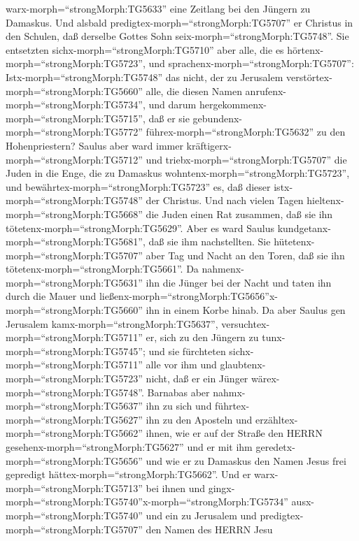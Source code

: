 warx-morph=``strongMorph:TG5633'' eine Zeitlang bei den Jüngern zu
Damaskus.  Und alsbald
predigtex-morph=``strongMorph:TG5707'' er Christus in den Schulen, daß
derselbe Gottes Sohn seix-morph=``strongMorph:TG5748''. 
Sie entsetzten sichx-morph=``strongMorph:TG5710'' aber alle, die es
hörtenx-morph=``strongMorph:TG5723'', und
sprachenx-morph=``strongMorph:TG5707'':
Istx-morph=``strongMorph:TG5748'' das nicht, der zu Jerusalem
verstörtex-morph=``strongMorph:TG5660'' alle, die diesen Namen
anrufenx-morph=``strongMorph:TG5734'', und darum
hergekommenx-morph=``strongMorph:TG5715'', daß er sie
gebundenx-morph=``strongMorph:TG5772''
führex-morph=``strongMorph:TG5632'' zu den Hohenpriestern? 
Saulus aber ward immer kräftigerx-morph=``strongMorph:TG5712'' und
triebx-morph=``strongMorph:TG5707'' die Juden in die Enge, die zu
Damaskus wohntenx-morph=``strongMorph:TG5723'', und
bewährtex-morph=``strongMorph:TG5723'' es, daß dieser
istx-morph=``strongMorph:TG5748'' der Christus.  Und nach
vielen Tagen hieltenx-morph=``strongMorph:TG5668'' die Juden einen Rat
zusammen, daß sie ihn tötetenx-morph=``strongMorph:TG5629''.
 Aber es ward Saulus
kundgetanx-morph=``strongMorph:TG5681'', daß sie ihm nachstellten. Sie
hütetenx-morph=``strongMorph:TG5707'' aber Tag und Nacht an den Toren,
daß sie ihn tötetenx-morph=``strongMorph:TG5661''.  Da
nahmenx-morph=``strongMorph:TG5631'' ihn die Jünger bei der Nacht und
taten ihn durch die Mauer und
ließenx-morph=``strongMorph:TG5656''x-morph=``strongMorph:TG5660'' ihn
in einem Korbe hinab.  Da aber Saulus gen Jerusalem
kamx-morph=``strongMorph:TG5637'',
versuchtex-morph=``strongMorph:TG5711'' er, sich zu den Jüngern zu
tunx-morph=``strongMorph:TG5745''; und sie fürchteten
sichx-morph=``strongMorph:TG5711'' alle vor ihm und
glaubtenx-morph=``strongMorph:TG5723'' nicht, daß er ein Jünger
wärex-morph=``strongMorph:TG5748''.  Barnabas aber
nahmx-morph=``strongMorph:TG5637'' ihn zu sich und
führtex-morph=``strongMorph:TG5627'' ihn zu den Aposteln und
erzähltex-morph=``strongMorph:TG5662'' ihnen, wie er auf der Straße den
HERRN gesehenx-morph=``strongMorph:TG5627'' und er mit ihm
geredetx-morph=``strongMorph:TG5656'' und wie er zu Damaskus den Namen
Jesus frei gepredigt hättex-morph=``strongMorph:TG5662''. 
Und er warx-morph=``strongMorph:TG5713'' bei ihnen und
gingx-morph=``strongMorph:TG5740''\textbar x-morph=``strongMorph:TG5734''
ausx-morph=``strongMorph:TG5740'' und ein zu Jerusalem und
predigtex-morph=``strongMorph:TG5707'' den Namen des HERRN Jesu

